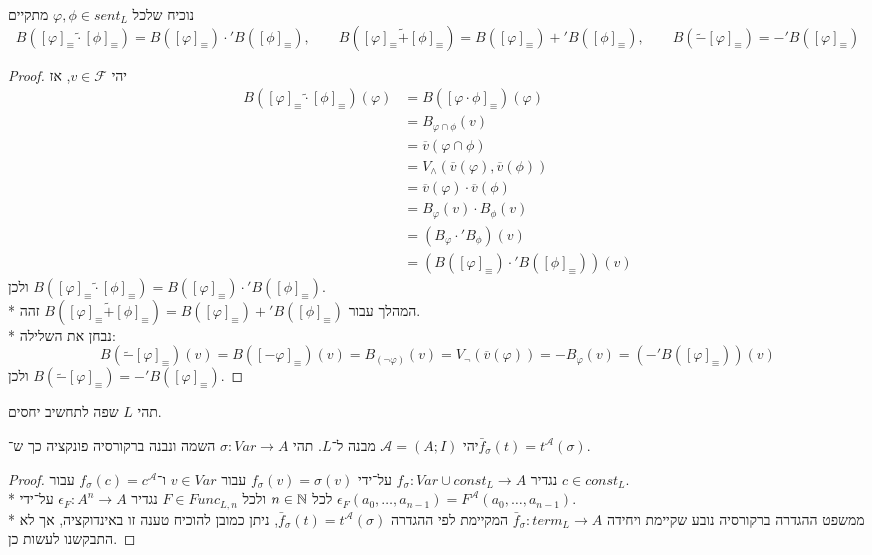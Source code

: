 \subquestion{}
נוכיח שלכל $\varphi, \phi \in sent_L$ מתקיים
\[
	B({[\varphi]}_\equiv \tilde{\cdot} {[\phi]}_\equiv) = B({[\varphi]}_\equiv) \cdot' B({[\phi]}_\equiv),
	\qquad
	B({[\varphi]}_\equiv \tilde{+} {[\phi]}_\equiv) = B({[\varphi]}_\equiv) +' B({[\phi]}_\equiv),
	\qquad
	B(\tilde{-} {[\varphi]}_\equiv) = -' B({[\varphi]}_\equiv)
\]
\begin{proof}
	יהי $v \in \mathcal{F}$, אז
	\begin{align*}
		B({[\varphi]}_\equiv \tilde{\cdot} {[\phi]}_\equiv)(\varphi)
		& = B({[\varphi \cdot \phi]}_\equiv)(\varphi) \\
		& = B_{\varphi \cap \phi}(v) \\
		& = \overline{v}(\varphi \cap \phi) \\
		& = V_\land(\overline{v}(\varphi), \overline{v}(\phi)) \\
		& = \overline{v}(\varphi) \cdot \overline{v}(\phi) \\
		& = B_\varphi(v) \cdot B_\phi(v) \\
		& = (B_\varphi \cdot' B_\phi)(v) \\
		& = (B({[\varphi]}_\equiv) \cdot' B({[\phi]}_\equiv))(v)
	\end{align*}
	ולכן $B({[\varphi]}_\equiv \tilde{\cdot} {[\phi]}_\equiv) = B({[\varphi]}_\equiv) \cdot' B({[\phi]}_\equiv)$. \\*
	המהלך עבור $B({[\varphi]}_\equiv \tilde{+} {[\phi]}_\equiv) = B({[\varphi]}_\equiv) +' B({[\phi]}_\equiv)$ זהה. \\*
	נבחן את השלילה:
	\[
		B(\tilde{-} {[\varphi]}_\equiv)(v)
		= B({[- \varphi]}_\equiv)(v)
		= B_{(\lnot \varphi)}(v)
		= V_\lnot(\overline{v}(\varphi))
		= - B_\varphi(v)
		= (-' B({[\varphi]}_\equiv))(v)
	\]
	ולכן $B(\tilde{-} {[\varphi]}_\equiv) = -' B({[\varphi]}_\equiv)$.
\end{proof}

\question{}
תהי $L$ שפה לתחשיב יחסים.

\subquestion{}
יהי $\mathcal{A} = (A; I)$ מבנה ל־$L$.
תהי $\sigma : Var \to A$ השמה ונבנה ברקורסיה פונקציה כך ש־$\bar{f}_\sigma(t) = t^\mathcal{A}(\sigma)$.
\begin{proof}
	נגדיר $f_\sigma : Var \cup const_L \to A$ על־ידי $f_\sigma(v) = \sigma(v)$ עבור $v \in Var$ ו־$f_\sigma(c) = c^\mathcal{A}$ עבור $c \in const_L$. \\*
	לכל $n \in \mathbb{N}$ ולכל $F \in Func_{L, n}$ נגדיר $\epsilon_F : A^n \to A$ על־ידי $\epsilon_F(a_0, \dots, a_{n - 1}) = F^\mathcal{A}(a_0, \dots, a_{n - 1})$. \\*
	ממשפט ההגדרה ברקורסיה נובע שקיימת ויחידה $\bar{f}_\sigma : term_L \to A$ המקיימת לפי ההגדרה $\bar{f}_\sigma(t) = t^\mathcal{A}(\sigma)$, ניתן כמובן להוכיח טענה זו באינדוקציה, אך לא התבקשנו לעשות כן.
\end{proof}

